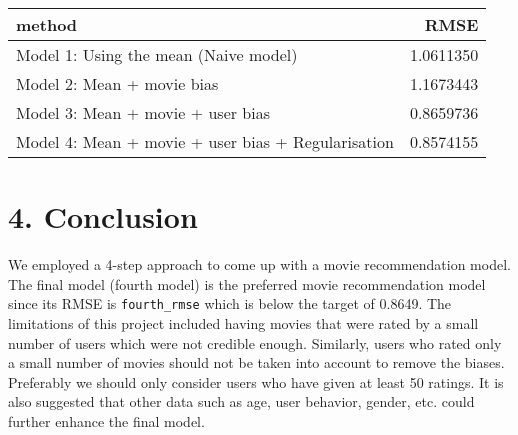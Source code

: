 \documentclass[
]{article}
\begin{document}
\begin{longtable}[]{@{}lr@{}}
\toprule
method & RMSE \\
\midrule
\endhead
Model 1: Using the mean (Naive model) & 1.0611350 \\
Model 2: Mean + movie bias & 1.1673443 \\
Model 3: Mean + movie + user bias & 0.8659736 \\
Model 4: Mean + movie + user bias + Regularisation & 0.8574155 \\
\bottomrule
\end{longtable}

\hypertarget{conclusion}{%
\section{4. Conclusion}\label{conclusion}}

We employed a 4-step approach to come up with a movie recommendation
model. The final model (fourth model) is the preferred movie
recommendation model since its RMSE is \texttt{fourth\_rmse} which is
below the target of 0.8649. The limitations of this project included
having movies that were rated by a small number of users which were not
credible enough. Similarly, users who rated only a small number of
movies should not be taken into account to remove the biases. Preferably
we should only consider users who have given at least 50 ratings. It is
also suggested that other data such as age, user behavior, gender, etc.
could further enhance the final model.
\end{document}
